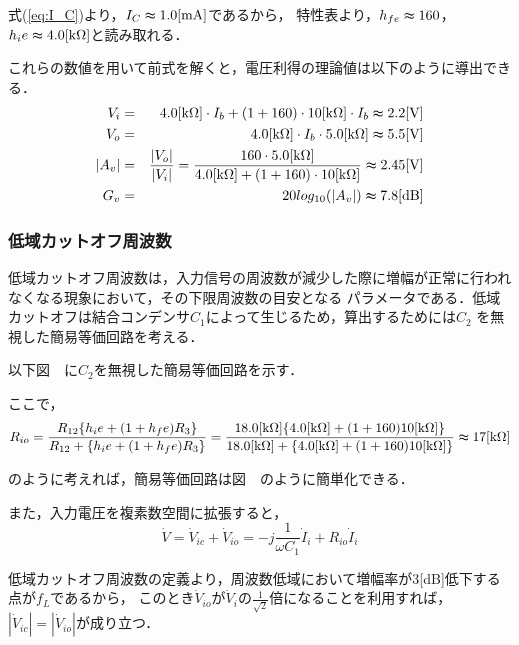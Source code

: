 \documentclass[dvipdfmx,titlepage,a4j]{jsarticle}  %
\numberwithin{equation}{section}
\begin{document}
式(\ref{eq:I_C})より，$I_C \thickapprox 1.0 \mathrm{[mA]}$であるから，
特性表より，$h_{fe} \thickapprox 160$，$h_ie \thickapprox 4.0 \mathrm{[k \Omega]}$と読み取れる．

これらの数値を用いて前式を解くと，電圧利得の理論値は以下のように導出できる．
\begin{eqnarray}
  V_i &=& 4.0 \mathrm{[k \Omega]} \cdot I_b + (1 + 160) \cdot 10 \mathrm{[k \Omega]} \cdot I_b \thickapprox 2.2\mathrm{[V]}\\
  V_o &=& 4.0 \mathrm{[k \Omega]} \cdot I_b \cdot 5.0\mathrm{[k\Omega]} \thickapprox 5.5\mathrm{[V]}\\
  \left\lvert A_v \right\rvert &=& \frac{\left\lvert V_o \right\rvert}{\left\lvert V_i \right\rvert}
  = \frac{160 \cdot 5.0\mathrm{[k\Omega]}}{4.0 \mathrm{[k \Omega]} + ( 1 + 160 ) \cdot 10 \mathrm{[k \Omega]}} \thickapprox 2.45\mathrm{[V]}  \\
  G_v &=& 20log_{10}(\left\lvert A_v \right\rvert) \thickapprox 7.8\mathrm{[dB]}
\end{eqnarray}

\subsubsection{低域カットオフ周波数}
低域カットオフ周波数は，入力信号の周波数が減少した際に増幅が正常に行われなくなる現象において，その下限周波数の目安となる
パラメータである．低域カットオフは結合コンデンサ$C_1$によって生じるため，算出するためには$C_2$
を無視した簡易等価回路を考える．

以下図　に$C_2$を無視した簡易等価回路を示す．

ここで，
\begin{equation}
  R_{io} = \frac{R_{12} \{h_ie + ( 1 + h_fe)R_3\}}{R_{12} + \{h_ie + ( 1 + h_fe)R_3\}} = \frac{18.0\mathrm{[k\Omega]} \{4.0 \mathrm{[k \Omega]} + ( 1 + 160) 10 \mathrm{[k \Omega]}\}}{18.0\mathrm{[k\Omega]} + \{4.0 \mathrm{[k \Omega]} + ( 1 + 160)10 \mathrm{[k \Omega]}\}} \thickapprox 17 \mathrm{[k \Omega]}
\end{equation}

のように考えれば，簡易等価回路は図　のように簡単化できる．

また，入力電圧を複素数空間に拡張すると，
\begin{equation}
  \dot{V} = \dot{V}_{ic} + \dot{V}_{io} = -j \frac{1}{\omega C_1} \dot{I}_i + R_{io} \dot{I}_i
\end{equation}

低域カットオフ周波数の定義より，周波数低域において増幅率が3[dB]低下する点が$f_L$であるから，
このとき$\dot{V}_{io}$が$\dot{V}_{i}$の$\frac{1}{\sqrt{2}}$倍になることを利用すれば，
$\left\lvert \dot{V}_{ic} \right\rvert = \left\lvert \dot{V}_{io} \right\rvert$が成り立つ．
\end{document}

